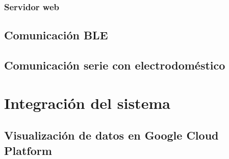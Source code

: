 \subsubsection{Servidor web}

\subsection{Comunicación BLE}

\subsection{Comunicación serie con electrodoméstico}

\section{Integración del sistema}

\subsection{Visualización de datos en Google Cloud Platform}
























